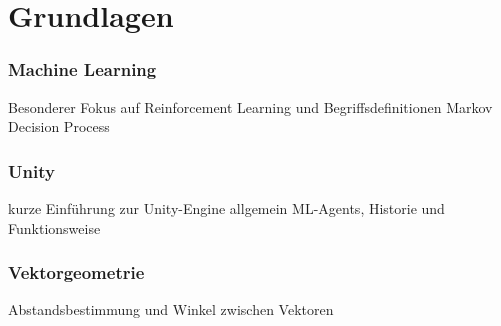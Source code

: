\chapter{Grundlagen}
\subsection{Machine Learning}
Besonderer Fokus auf Reinforcement Learning und Begriffsdefinitionen
Markov Decision Process

\subsection{Unity}
kurze Einführung zur Unity-Engine allgemein
ML-Agents, Historie und Funktionsweise

\subsection{Vektorgeometrie}
Abstandsbestimmung und Winkel zwischen Vektoren